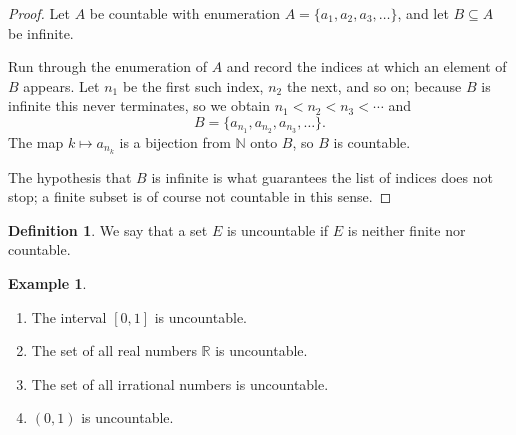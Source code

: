 \documentclass[11pt,a4paper]{article}
\theoremstyle{definition}
\newtheorem{defn}[thm]{Definition}
\newtheorem{exa}[thm]{Example}
\begin{document}
\begin{proof}
Let $A$ be countable with enumeration $A=\{a_1,a_2,a_3,\dots\}$, and let
$B\subseteq A$ be infinite.

Run through the enumeration of $A$ and record the indices at which an element
of $B$ appears. Let $n_1$ be the first such index, $n_2$ the next, and so on;
because $B$ is infinite this never terminates, so we obtain
$n_1<n_2<n_3<\cdots$ and
$$B=\{a_{n_1},a_{n_2},a_{n_3},\dots\}.$$
The map $k\mapsto a_{n_k}$ is a bijection from $\mathbb{N}$ onto $B$, so $B$ is
countable.

The hypothesis that $B$ is infinite is what guarantees the list of indices does
not stop; a finite subset is of course not countable in this sense.
\end{proof}


\begin{defn}
We say that  a set $E$ is uncountable if $E$ is neither finite nor countable.

\end{defn}


\begin{exa}
\begin{enumerate}
\item[a] The interval $[0,1]$ is uncountable.
\item[b] The set of all real numbers $\mathbb{R}$ is uncountable.
\item[c] The set of all irrational numbers is uncountable.
\item[d] $(0,1)$ is uncountable.
\end{enumerate}
\end{exa}
\end{document}
